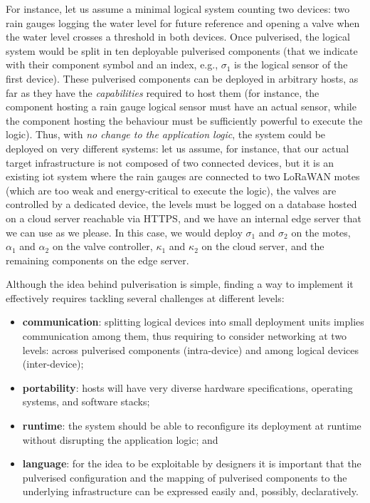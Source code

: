 \documentclass[conference]{IEEEtran}
\begin{document}
For instance, let us assume a minimal logical system counting two devices:
two rain gauges logging the water level for future reference
and opening a valve when the water level crosses a threshold in both devices.
%
Once pulverised, the logical system would be split in ten deployable pulverised components
(that we indicate with their component symbol and an index, e.g., $\sigma_1$ is the logical sensor of the first device).
%
These pulverised components can be deployed in arbitrary hosts,
as far as they have the \emph{capabilities} required to host them
(for instance, the component hosting a rain gauge logical sensor must have an actual sensor,
while the component hosting the behaviour must be sufficiently powerful to execute the logic).
%
Thus, with \emph{no change to the application logic},
the system could be deployed on very different systems:
let us assume, for instance,
that our actual target infrastructure is not composed of two connected devices,
but it is an existing \ac{iot} system
where the rain gauges are connected to two LoRaWAN motes
(which are too weak and energy-critical to execute the logic),
the valves are controlled by a dedicated device,
the levels must be logged on a database hosted on a cloud server reachable via HTTPS,
and we have an internal edge server that we can use as we please.
%
In this case, we would deploy $\sigma_1$ and $\sigma_2$ on the motes,
$\alpha_1$ and $\alpha_2$ on the valve controller,
$\kappa_1$ and $\kappa_2$ on the cloud server,
and the remaining components on the edge server.

Although the idea behind pulverisation is simple,
finding a way to implement it effectively requires tackling several challenges at different levels:
\begin{itemize}
    \item \textbf{communication}: splitting logical devices into small deployment units implies communication among them,
    thus requiring to consider networking at two levels:
    across pulverised components (intra-device) and among logical devices (inter-device);
    \item \textbf{portability}: hosts will have very diverse hardware specifications, operating systems, and software stacks;
    \item \textbf{runtime}: the system should be able to reconfigure its deployment at runtime without disrupting the application logic; and
    \item \textbf{language}: for the idea to be exploitable by designers it is important that
    the pulverised configuration
    and the mapping of pulverised components to the underlying infrastructure
    can be expressed easily and, possibly, declaratively.
\end{itemize}
\end{document}
